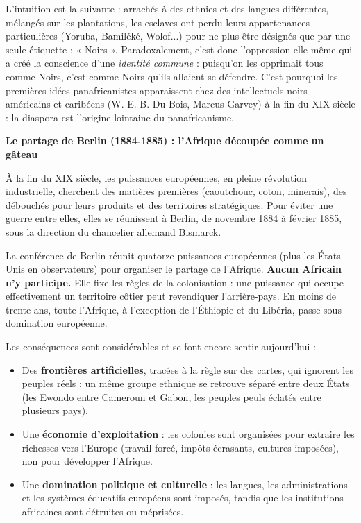 \documentclass[11pt]{article}
\newcounter{popsec}
\newcounter{popsub}
\newcommand{\courssub}[1]{%
  \stepcounter{popsub}%
  \par\vspace{9pt}\noindent{\popxbold\fontsize{11.5}{13}\selectfont\color{popink}{\color{poporange}\thepopsec.\thepopsub}\hspace{6pt}#1}\par\nopagebreak\vspace{4pt}
}
\begin{document}
L'intuition est la suivante : arrachés à des ethnies et des langues différentes, mélangés sur les plantations, les esclaves ont perdu leurs appartenances particulières (Yoruba, Bamiléké, Wolof...) pour ne plus être désignés que par une seule étiquette : « Noirs ». Paradoxalement, c'est donc l'oppression elle-même qui a créé la conscience d'une \emph{identité commune} : puisqu'on les opprimait tous comme Noirs, c'est comme Noirs qu'ils allaient se défendre. C'est pourquoi les premières idées panafricanistes apparaissent chez des intellectuels noirs américains et caribéens (W. E. B. Du Bois, Marcus Garvey) à la fin du XIX\ieme{} siècle : la diaspora est l'origine lointaine du panafricanisme.

\courssub{La colonisation européenne de l'Afrique}

\textbf{Le partage de Berlin (1884-1885) : l'Afrique découpée comme un gâteau}\par

À la fin du XIX\ieme{} siècle, les puissances européennes, en pleine révolution industrielle, cherchent des matières premières (caoutchouc, coton, minerais), des débouchés pour leurs produits et des territoires stratégiques. Pour éviter une guerre entre elles, elles se réunissent à Berlin, de novembre 1884 à février 1885, sous la direction du chancelier allemand Bismarck.

\begin{aretenir}
La conférence de Berlin réunit quatorze puissances européennes (plus les États-Unis en observateurs) pour organiser le partage de l'Afrique. \textbf{Aucun Africain n'y participe.} Elle fixe les règles de la colonisation : une puissance qui occupe effectivement un territoire côtier peut revendiquer l'arrière-pays. En moins de trente ans, toute l'Afrique, à l'exception de l'Éthiopie et du Libéria, passe sous domination européenne.
\end{aretenir}

Les conséquences sont considérables et se font encore sentir aujourd'hui :

\begin{itemize}
\item Des \textbf{frontières artificielles}, tracées à la règle sur des cartes, qui ignorent les peuples réels : un même groupe ethnique se retrouve séparé entre deux États (les Ewondo entre Cameroun et Gabon, les peuples peuls éclatés entre plusieurs pays).
\item Une \textbf{économie d'exploitation} : les colonies sont organisées pour extraire les richesses vers l'Europe (travail forcé, impôts écrasants, cultures imposées), non pour développer l'Afrique.
\item Une \textbf{domination politique et culturelle} : les langues, les administrations et les systèmes éducatifs européens sont imposés, tandis que les institutions africaines sont détruites ou méprisées.
\end{itemize}
\end{document}
